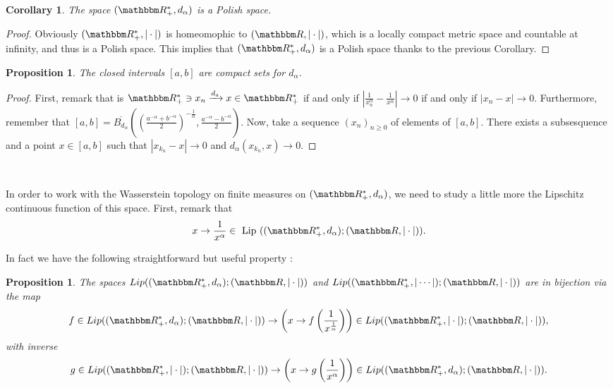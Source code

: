 \documentclass[a4paper,11pt, reqno]{amsart}
\newcommand{\1}{\mathbbm{1}}
\theoremstyle{plain}
\newtheorem{corollary}[theorem]{Corollary}
\newtheorem{proposition}[theorem]{Proposition}
\theoremstyle{definition}
\begin{document}
\begin{corollary}
  The space $(\RR_+^{\ast}, d_{\alpha})$ is a Polish space.
\end{corollary}

\begin{proof}
  Obviously $(\RR_+^{\ast}, | \cdot |)$ is homeomophic to
  $(\RR, | \cdot |)$, which is a locally compact metric space and
  countable at infinity, and thus is a Polish space. This implies that
  $(\RR_+^{\ast}, d_{\alpha})$ is a Polish space thanks to the previous
  Corollary.
\end{proof}

\begin{proposition}
  \label{prop:compact-dalpha}The closed intervals $[a, b]$ are compact sets
  for $d_{\alpha}$.
\end{proposition}

\begin{proof}
  First, remark that is $\RR_+^{\ast} \ni x_n \xrightarrow{d_a} x \in
  \RR_+^{\ast}$ if and only if $\left| \frac{1}{x_n^{\alpha}} -
  \frac{1}{x^{\alpha}} \right| \rightarrow 0$ if and only if $| x_n - x |
  \rightarrow 0$. Furthermore, remember that $[a, b] =
  \overline{B_{d_{\alpha}}} \left( \left( \frac{a^{- \alpha} + b^{-
  \alpha}}{2} \right)^{- \frac{1}{\alpha}}, \frac{a^{- \alpha} - b^{-
  \alpha}}{2} \right)$. Now, take a sequence $(x_n)_{n \ge 0}$ of
  elements of $[a, b]$. There exists a subsesquence and a point $x \in [a, b]$
  such that $| x_{k_n} - x | \rightarrow 0$ and $d_{\alpha} (x_{k_n}, x)
  \rightarrow 0$.
\end{proof}

\

In order to work with the Wasserstein topology on finite measures on
$(\RR_+^{\ast}, d_{\alpha})$, we need to study a little more the
Lipschitz continuous function of this space. First, remark that
\[ x \rightarrow \frac{1}{x^{\alpha}} \in  \text{ Lip } ((\RR_+^{\ast},
   d_{\alpha}) ; (\RR, | \cdot |)) . \]

In fact we have the following straightforward but useful property :

\begin{proposition}\label{prop:lip-isometry}
The spaces $Lip((\RR_+^*,d_\alpha);(\RR,|\cdot|))$ and $Lip((\RR_+^*,|\cdots|);(\RR,|\cdot|))$ are in bijection via the map 
\[f \in Lip((\RR_+^*,d_\alpha);(\RR,|\cdot|)) \to \left(x \to f\left(\frac{1}{x^{\frac{1}{\alpha}}}\right)\right) \in Lip((\RR_+^*,|\cdot|);(\RR,|\cdot|)),\]
with inverse
\[g \in Lip((\RR_+^*,|\cdot|);(\RR,|\cdot|)) \to \left(x \to g\left(\frac{1}{x^{\alpha}}\right)\right) \in Lip((\RR_+^*,d_\alpha);(\RR,|\cdot|)).\]
\end{proposition}
\end{document}

